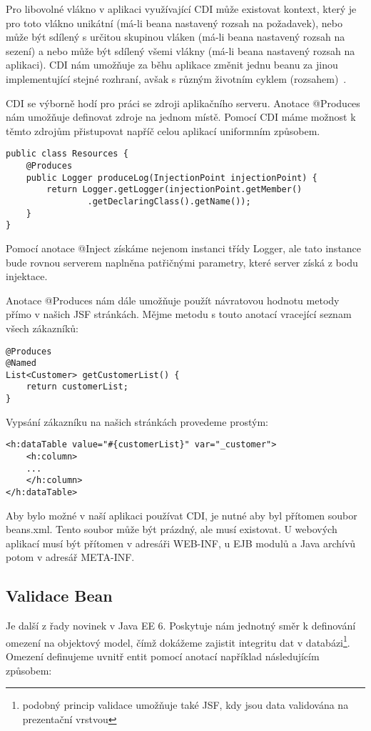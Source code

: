 \documentclass[122pt,oneside]{fithesis}
\begin{document}
Pro libovolné vlákno v aplikaci využívající CDI může existovat kontext, který je pro toto vlákno unikátní (má-li beana nastavený rozsah na požadavek), nebo může být sdílený s určitou skupinou vláken (má-li beana nastavený rozsah na sezení) a nebo může být sdílený všemi vlákny (má-li beana nastavený rozsah na aplikaci). CDI nám umožňuje za běhu aplikace změnit jednu beanu za jinou implementující stejné rozhraní, avšak s různým životním cyklem (rozsahem)~\cite{weld}.

CDI se výborně hodí pro práci se zdroji aplikačního serveru. Anotace @Produces nám umožňuje definovat zdroje na jednom místě. Pomocí CDI máme možnost k těmto zdrojům přistupovat napříč celou aplikací uniformním způsobem.

\begin{lstlisting}
public class Resources {
	@Produces
	public Logger produceLog(InjectionPoint injectionPoint) {
		return Logger.getLogger(injectionPoint.getMember()
				.getDeclaringClass().getName());
	}
}
\end{lstlisting}

Pomocí anotace @Inject získáme nejenom instanci třídy Logger, ale tato instance bude rovnou serverem naplněna patřičnými parametry, které server získá z bodu injektace.

Anotace @Produces nám dále umožňuje použít návratovou hodnotu metody přímo v našich JSF stránkách. Mějme metodu s touto anotací vracející seznam všech zákazníků:

\begin{lstlisting}
@Produces
@Named
List<Customer> getCustomerList() {
	return customerList;
}
\end{lstlisting}

Vypsání zákazníku na našich stránkách provedeme prostým:

\begin{lstlisting}
<h:dataTable value="#{customerList}" var="_customer">
	<h:column>
	...
	</h:column>
</h:dataTable>
\end{lstlisting}

Aby bylo možné v naší aplikaci používat CDI, je nutné aby byl přítomen soubor beans.xml. Tento soubor může být prázdný, ale musí existovat. U webových aplikací musí být přítomen v adresáři WEB-INF, u EJB modulů a Java archívů potom v adresář META-INF.

\subsection{Validace Bean}
Je další z řady novinek v Java EE 6. Poskytuje nám jednotný směr k definování omezení na objektový model, čímž dokážeme zajistit integritu dat v databázi\footnote[1]{podobný princip validace umožňuje také JSF, kdy jsou data validována na prezentační vrstvou}. Omezení definujeme uvnitř entit pomocí anotací například následujícím způsobem:
\end{document}
